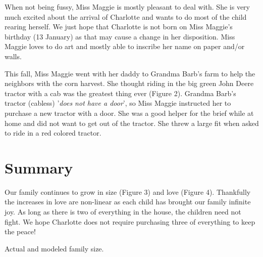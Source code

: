 \documentclass[letterpaper,11pt]{article}
\makeatletter
\newenvironment{figurehere}
  {\def\@captype{figure}}
  {}
\makeatother
\begin{document}
\begin{multicols}{2}
When not being fussy, Miss Maggie is mostly pleasant to deal with.  She is very
much excited about the arrival of Charlotte and wants to do most of the child
rearing herself. We just hope that Charlotte is not born on Miss Maggie's
birthday (13 January) as that may cause a change in her disposition.  Miss
Maggie loves to do art and mostly able to inscribe her name on paper and/or walls.

This fall, Miss Maggie went with her daddy to Grandma Barb's farm to help the
neighbors with the corn harvest.  She thought riding in the big green John Deere
tractor with a cab was the greatest thing ever (Figure 2).  Grandma Barb's
tractor (cabless) '\textit{does not have a door}', so Miss Maggie instructed her
to purchase a new tractor with a door.  She was a good helper for the brief
while at home and did not want to get out of the tractor. She threw a large fit
when asked to ride in a red colored tractor.

\section{Summary}

Our family continues to grow in size (Figure 3) and love (Figure 4). Thankfully
the increases in love are non-linear as each child has brought our family
infinite joy.  As long as there is two of everything in the house, the children
need not fight.  We hope Charlotte does not require purchasing three of
everything to keep the peace!

\begin{figurehere}
 \centering   
 \caption{Actual and modeled family size.}
\end{figurehere}


\end{multicols}
\end{document}
